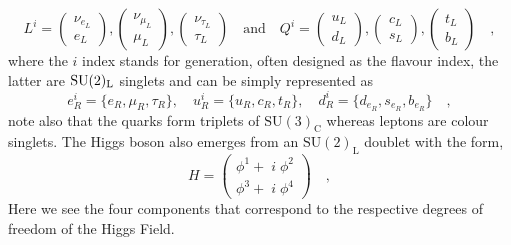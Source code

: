 \begin{equation}
L^i= \begin{pmatrix}
\nu_{e_L} \\ e_L 
\end{pmatrix},
\begin{pmatrix}
\nu_{\mu_L} \\ \mu_L 
\end{pmatrix},
\begin{pmatrix}
\nu_{\tau_L} \\ \tau_L 
\end{pmatrix} 
\quad 
\text{and} \quad Q^i= \begin{pmatrix}
u_{L} \\
d_L 
\end{pmatrix},\begin{pmatrix}
c_{L} \\
s_L 
\end{pmatrix}
,\begin{pmatrix}
t_{L} \\
b_L 
\end{pmatrix} \quad ,
\end{equation}
where the $i$ index stands for generation, often designed as the flavour index, the latter are $\mathrm{SU}(2)_{\mathrm{L}}$ singlets and can be simply represented as
%
 \begin{equation}
e^i_R=\{e_R,\mu_R,\tau_R\}, \quad  u^i_R=\{u_R,c_R,t_R\}, \quad d^i_R=\{d_{e_R},s_{e_R},b_{e_R}\} \quad , 
\end{equation}
%
note also that the quarks form triplets of $\mathrm{SU(3)_C}$ whereas leptons are colour singlets. The Higgs boson also emerges from an $\mathrm{SU(2)_L}$ doublet with the form,
%
\begin{equation}
H=\begin{pmatrix}
\phi^1 + \; i \; \phi^2 \\
\phi^3 + \; i \; \phi^4  
\end{pmatrix} \quad , 
\end{equation}
%
%
%
Here we see the four components that correspond to the respective degrees of freedom of the Higgs Field. 

